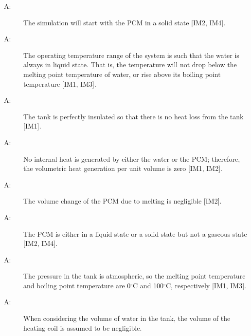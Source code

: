 \documentclass[12pt]{article}
\newcounter{assumpnum}
\newcommand{\atheassumpnum}{A\theassumpnum}
\begin{document}
\begin{description}
\item[\atheassumpnum\label{A:PCM-Initialli-Soild}:]The simulation will start with the PCM in a solid state {[}IM2, IM4{]}.
\end{description}
\begin{description}
\item[\atheassumpnum\label{A:Water-Always-Liquid}:]The operating temperature range of the system is such that the water is always in liquid state. That is, the temperature will not drop below the melting point temperature of water, or rise above its boiling point temperature {[}IM1, IM3{]}.
\end{description}
\begin{description}
\item[\atheassumpnum\label{A:Perfect-Insulation-Tank}:]The tank is perfectly insulated so that there is no heat loss from the tank {[}IM1{]}.
\end{description}
\begin{description}
\item[\atheassumpnum\label{A:No-Internal-Heat-Generation-By-Water-PCM}:]No internal heat is generated by either the water or the PCM; therefore, the volumetric heat generation per unit volume is zero {[}IM1, IM2{]}.
\end{description}
\begin{description}
\item[\atheassumpnum\label{A:Volume-Change-Melting-PCM-Negligible}:]The volume change of the PCM due to melting is negligible {[}IM2{]}.
\end{description}
\begin{description}
\item[\atheassumpnum\label{A:No-Gaseous-State-PCM}:]The PCM is either in a liquid state or a solid state but not a gaseous state {[}IM2, IM4{]}.
\end{description}
\begin{description}
\item[\atheassumpnum\label{A:Atmospheric-Pressure-Tank}:]The pressure in the tank is atmospheric, so the melting point temperature and boiling point temperature are 0${}^{\circ}$C and 100${}^{\circ}$C, respectively {[}IM1, IM3{]}.
\end{description}
\begin{description}
\item[\atheassumpnum\label{A:Volume-Coil-Negligible}:]When considering the volume of water in the tank, the volume of the heating coil is assumed to be negligible.
\end{description}
\end{document}
